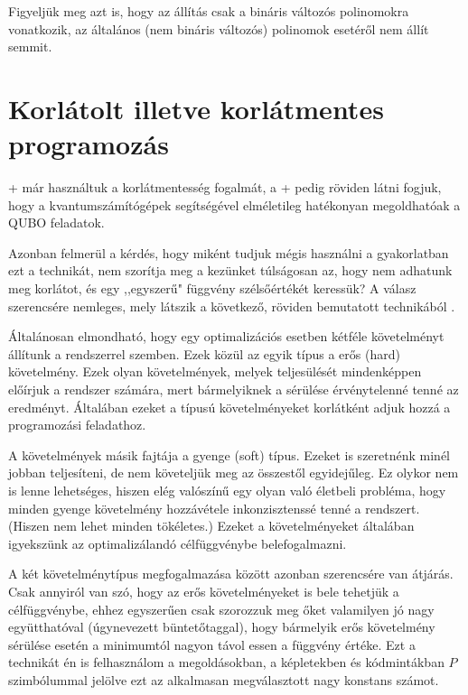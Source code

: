 Figyeljük meg azt is, hogy az állítás csak a bináris változós polinomokra vonatkozik, az általános (nem bináris változós) polinomok esetéről nem állít semmit.


\section{Korlátolt illetve korlátmentes programozás} \label{sec:constrainedVSunconstrained}

\Az+ már használtuk a korlátmentesség fogalmát, a \az+ pedig röviden látni fogjuk, hogy a kvantumszámítógépek segítségével elméletileg hatékonyan megoldhatóak a QUBO feladatok.

Azonban felmerül a kérdés, hogy miként tudjuk mégis használni a gyakorlatban ezt a technikát, nem szorítja meg a kezünket túlságosan az, hogy nem adhatunk meg korlátot, és egy ,,egyszerű" függvény szélsőértékét keressük? A válasz szerencsére nemleges, mely látszik a következő, röviden bemutatott technikából \cite{DBLP:journals/corr/abs-1811-11538}. 

Általánosan elmondható, hogy egy optimalizációs esetben kétféle követelményt állítunk a rendszerrel szemben. Ezek közül az egyik típus a erős (hard) követelmény. Ezek olyan követelmények, melyek teljesülését mindenképpen előírjuk a rendszer számára, mert bármelyiknek a sérülése érvénytelenné tenné az eredményt. Általában ezeket a típusú követelményeket korlátként adjuk hozzá a programozási feladathoz.

A követelmények másik fajtája a gyenge (soft) típus. Ezeket is szeretnénk minél jobban teljesíteni, de nem követeljük meg az összestől egyidejűleg. Ez olykor nem is lenne lehetséges, hiszen elég valószínű egy olyan való életbeli probléma, hogy minden gyenge követelmény hozzávétele inkonzisztenssé tenné a rendszert. (Hiszen nem lehet minden tökéletes.) Ezeket a követelményeket általában igyekszünk az optimalizálandó célfüggvénybe belefogalmazni.

A két követelménytípus megfogalmazása között azonban szerencsére van átjárás. Csak annyiról van szó, hogy az erős követelményeket is bele tehetjük a célfüggvénybe, ehhez egyszerűen csak szorozzuk meg őket valamilyen jó nagy együtthatóval (úgynevezett büntetőtaggal), hogy bármelyik erős követelmény sérülése esetén a minimumtól nagyon távol essen a függvény értéke.
Ezt a technikát én is felhasználom a megoldásokban, a képletekben és kódmintákban $P$ szimbólummal jelölve ezt az alkalmasan megválasztott nagy konstans számot.

